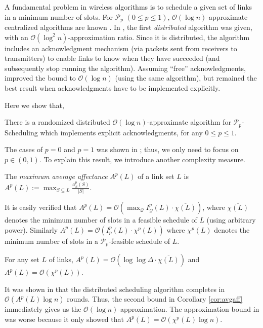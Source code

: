 \documentclass[11pt]{amsart}
\newcommand{\cal}[1]{\mathcal{#1}}
\newcommand{\BO}{\mathcal{O}}
\def\calP{{\cal P}}
\def\calQ{{\cal Q}}
\newcommand{\prob}[1]{\textsf{#1}}  \newcommand{\alg}[1]{\textbf{#1}}
\def\calP{{\cal P}}   \def\calM{{\cal M}}   \def\calU{{\cal U}}   \newcommand{\PCopt}{\overline{OPT}}
\newcommand{\powp}{\calP_p}
\begin{document}
A fundamental problem in wireless algorithms is to schedule a given set of links in a minimum number of slots. 
For $\powp$ $(0 \le p \le 1)$, $\BO(\log n)$-approximate centralized algorithms are known \cite{SODA11}.
In \cite{KV10}, the first \emph{distributed} algorithm was given, with an $\BO(\log^2 n)$-approximation ratio. 
Since it is distributed, the algorithm
includes an acknowledgment mechanism (via packets sent from receivers to transmitters) to enable links to know when they have succeeded (and subsequently stop running the algorithm). Assuming ``free'' acknowledgments, \cite{HM11a} improved
the bound to $\BO(\log n)$  (using the same algorithm), but \cite{KV10} remained the best result when acknowledgments have to be implemented explicitly. 

Here we show that, 
\begin{theorem}
There is a randomized distributed $\BO(\log n)$-approximate algorithm 
for \prob{$\powp$-Scheduling} which implements explicit acknowledgments, for any $0 \le p \le 1$. 
\end{theorem}

The cases of $p = 0$ and $p = 1$ was shown in \cite{HM11a}; thus, we only need to focus on $p \in (0, 1)$.
To explain this result, we introduce another complexity measure. 

\begin{defn} \cite{KV10} 
The \emph{maximum average affectance} $A^p(L)$ of a link set 
$L$ is 
$A^p(L) := \max_{S \subseteq L}\frac{a^p_S(S)}{|S|}$.
\end{defn}
It is easily verified that $A^p(L) = \BO(\max_{\calQ} I^p_{\calQ}(L) \cdot \overline{\chi(L)})$,
where $\overline{\chi(L)}$ denotes the minimum number of slots in a feasible schedule of $L$ (using arbitrary power).
Similarly $A^p(L) = \BO(I^p_{p}(L) \cdot \chi^p(L))$ where ${\chi^p(L)}$ denotes the minimum number of slots in a $\powp$-feasible schedule of $L$.

\begin{corollary}
For any set $L$ of links, $A^p(L) = \BO(\log\log \Delta \cdot \overline{\chi(L)})$ and $A^p(L) = \BO({\chi^p(L)})$.
\label{cor:avgaff}
\end{corollary}

It was shown in \cite{KV10} that the distributed scheduling algorithm completes in $\BO(A^p(L) \log n)$ rounds. Thus, the second bound in Corollary \ref{cor:avgaff}
immediately gives us the $\BO(\log n)$-approximation. The approximation bound in \cite{KV10} was worse because it only showed that $A^p(L) = \BO(\chi^p(L) \log n)$.
\end{document}
